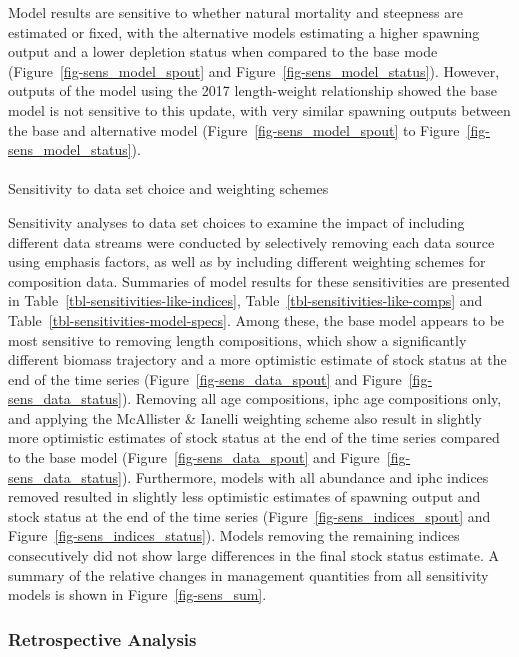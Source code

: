 \documentclass[
]{scrartcl}
\makeatletter
\let\oldparagraph\paragraph
\renewcommand{\paragraph}{
    \@ifstar
      \xxxParagraphStar
      \xxxParagraphNoStar
  }
\newcommand{\xxxParagraphStar}[1]{\oldparagraph*{#1}\mbox{}}
\newcommand{\xxxParagraphNoStar}[1]{\oldparagraph{#1}\mbox{}}
\makeatother
\begin{document}
Model results are sensitive to whether natural mortality and steepness
are estimated or fixed, with the alternative models estimating a higher
spawning output and a lower depletion status when compared to the base
mode (Figure~\ref{fig-sens_model_spout} and
Figure~\ref{fig-sens_model_status}). However, outputs of the model using
the 2017 length-weight relationship showed the base model is not
sensitive to this update, with very similar spawning outputs between the
base and alternative model (Figure~\ref{fig-sens_model_spout} to
Figure~\ref{fig-sens_model_status}).

\paragraph{Sensitivity to data set choice and weighting
schemes}\label{sensitivity-to-data-set-choice-and-weighting-schemes}

Sensitivity analyses to data set choices to examine the impact of
including different data streams were conducted by selectively removing
each data source using emphasis factors, as well as by including
different weighting schemes for composition data. Summaries of model
results for these sensitivities are presented in
Table~\ref{tbl-sensitivities-like-indices},
Table~\ref{tbl-sensitivities-like-comps} and
Table~\ref{tbl-sensitivities-model-specs}. Among these, the base model
appears to be most sensitive to removing length compositions, which show
a significantly different biomass trajectory and a more optimistic
estimate of stock status at the end of the time series
(Figure~\ref{fig-sens_data_spout} and
Figure~\ref{fig-sens_data_status}). Removing all age compositions,
\gls{iphc} age compositions only, and applying the McAllister \& Ianelli
weighting scheme also result in slightly more optimistic estimates of
stock status at the end of the time series compared to the base model
(Figure~\ref{fig-sens_data_spout} and
Figure~\ref{fig-sens_data_status}). Furthermore, models with all
abundance and \gls{iphc} indices removed resulted in slightly less
optimistic estimates of spawning output and stock status at the end of
the time series (Figure~\ref{fig-sens_indices_spout} and
Figure~\ref{fig-sens_indices_status}). Models removing the remaining
indices consecutively did not show large differences in the final stock
status estimate. A summary of the relative changes in management
quantities from all sensitivity models is shown in
Figure~\ref{fig-sens_sum}.

\subsubsection{Retrospective Analysis}\label{retrospective-analysis}
\end{document}
